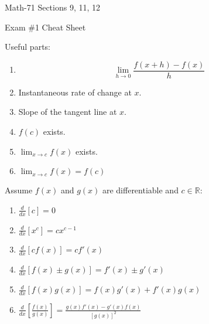 \documentclass[letterpaper,12pt,fleqn]{article}
\begin{document}
\begin{center}
  \large
  Math-71 Sections 9, 11, 12

  \Large
  Exam \#1 Cheat Sheet
\end{center}

\vspace{0.25in}

Useful parts:
\begin{enumerate}
\item
  \[\lim_{h\to0}\frac{f(x+h)-f(x)}{h}\]
\item Instantaneous rate of change at \(x\).
\item Slope of the tangent line at \(x\).
\item \(f(c)\) exists.
\item \(\displaystyle\lim_{x\to c}f(x)\) exists.
\item \(\displaystyle\lim_{x\to c}f(x)=f(c)\)
\end{enumerate}

\bigskip

Assume \(f(x)\) and \(g(x)\) are differentiable and \(c\in\mathbb{R}\):
\begin{enumerate}
\item \(\frac{d}{dx}[c]=0\)
\item \(\frac{d}{dx}[x^c]=cx^{c-1}\)
\item \(\frac{d}{dx}[cf(x)]=cf'(x)\)
\item \(\frac{d}{dx}[f(x)\pm g(x)]=f'(x)\pm g'(x)\)
\item \(\frac{d}{dx}[f(x)g(x)]=f(x)g'(x)+f'(x)g(x)\)
\item \(\frac{d}{dx}\left[\frac{f(x)}{g(x)}\right]=\frac{g(x)f'(x)-g'(x)f(x)}{[g(x)]^2}\)
\end{enumerate}
\end{document}
